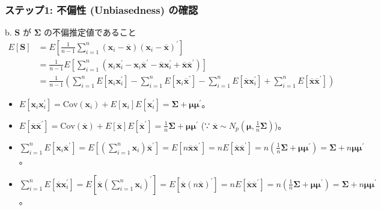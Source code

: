 \documentclass{beamer}
\begin{document}
\begin{frame}
\frametitle{ステップ1: 不偏性 (Unbiasedness) の確認}
\begin{block}{b. $\bm{S}$ が $\bm{\Sigma}$ の不偏推定値であること}
\begin{align*}
E[\bm{S}] &= E\left[\frac{1}{n-1}\sum_{i=1}^{n}(\bm{x}_i-\overline{\bm{x}})(\bm{x}_i-\overline{\bm{x}})^{\prime}\right] \\
&= \frac{1}{n-1}E\left[\sum_{i=1}^{n}(\bm{x}_i\bm{x}_i^{\prime}-\bm{x}_i\overline{\bm{x}}^{\prime}-\overline{\bm{x}}\bm{x}_i^{\prime}+\overline{\bm{x}}\overline{\bm{x}}^{\prime})\right] \\
&= \frac{1}{n-1}\left(\sum_{i=1}^{n}E[\bm{x}_i\bm{x}_i^{\prime}]-\sum_{i=1}^{n}E[\bm{x}_i\overline{\bm{x}}^{\prime}]-\sum_{i=1}^{n}E[\overline{\bm{x}}\bm{x}_i^{\prime}]+\sum_{i=1}^{n}E[\overline{\bm{x}}\overline{\bm{x}}^{\prime}]\right)
\end{align*}
\begin{itemize}
    \item $E[\bm{x}_i\bm{x}_i^{\prime}]=\text{Cov}(\bm{x}_i)+E[\bm{x}_i]E[\bm{x}_i^{\prime}]=\bm{\Sigma}+\bm{\mu}\bm{\mu}^{\prime}$。
    \item $E[\overline{\bm{x}}\overline{\bm{x}}^{\prime}]=\text{Cov}(\overline{\bm{x}})+E[\overline{\bm{x}}]E[\overline{\bm{x}}^{\prime}]=\frac{1}{n}\bm{\Sigma}+\bm{\mu}\bm{\mu}^{\prime}$ (∵ $\overline{\bm{x}}\sim N_p(\bm{\mu},\frac{1}{n}\bm{\Sigma})$)。
    \item $\sum_{i=1}^{n}E[\bm{x}_i\overline{\bm{x}}^{\prime}]=E[(\sum_{i=1}^{n}\bm{x}_i)\overline{\bm{x}}^{\prime}]=E[n\overline{\bm{x}}\overline{\bm{x}}^{\prime}]=nE[\overline{\bm{x}}\overline{\bm{x}}^{\prime}]=n(\frac{1}{n}\bm{\Sigma}+\bm{\mu}\bm{\mu}^{\prime})=\bm{\Sigma}+n\bm{\mu}\bm{\mu}^{\prime}$。
    \item $\sum_{i=1}^{n}E[\overline{\bm{x}}\bm{x}_i^{\prime}]=E[\overline{\bm{x}}(\sum_{i=1}^{n}\bm{x}_i)^{\prime}]=E[\overline{\bm{x}}(n\overline{\bm{x}})^{\prime}]=nE[\overline{\bm{x}}\overline{\bm{x}}^{\prime}]=n(\frac{1}{n}\bm{\Sigma}+\bm{\mu}\bm{\mu}^{\prime})=\bm{\Sigma}+n\bm{\mu}\bm{\mu}^{\prime}$。
\end{itemize}
\end{block}
\end{frame}
\end{document}
